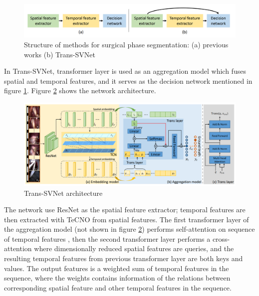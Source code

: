 \documentclass[11pt]{article} \usepackage[top=1in, bottom=1in, left=1in, right=1in]{geometry}
\begin{document}
\begin{figure}[H]
  \includegraphics[width=\textwidth]{trans_svnet_1.png}
  \centering
  \caption{ Structure of methods for surgical phase segmentation: (a) previous works (b) Trans-SVNet \cite{TransSVNet}}
  \label{fig:transsvnet_structure}
\end{figure}

\vspace{0.25cm}
\noindent
In Trans-SVNet, transformer layer is used as an aggregation model which fuses spatial and temporal features, and it serves as the decision network mentioned in figure \ref{fig:transsvnet_structure}. Figure \ref{fig:transsvnet_network} shows the network architecture.

\begin{figure}[H]
  \includegraphics[width=\textwidth]{trans_svnet_2.png}
  \centering
  \caption{ Trans-SVNet architecture\cite{TransSVNet}}
  \label{fig:transsvnet_network}
\end{figure}

\vspace{0.25cm}
\noindent
The network use ResNet as the spatial feature extractor; temporal features are then extracted with TeCNO from spatial features. The first transformer layer of the aggregation model (not shown in figure \ref{fig:transsvnet_network}) performs self-attention on sequence of temporal features , then the second transformer layer performs a cross-attention where dimensionally reduced spatial features are queries, and the resulting temporal features from previous transformer layer are both keys and values. The output features is a weighted sum of temporal features in the sequence, where the weights contains information of the relations between corresponding spatial feature and other temporal features in the sequence.
\end{document}
